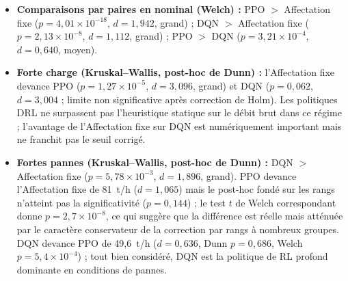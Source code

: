 \documentclass[11pt,a4paper]{article}
\begin{document}
\begin{itemize}
  \item \textbf{Comparaisons par paires en nominal (Welch) :} PPO $>$ Affectation fixe ($p=4{,}01\times10^{-18}$, $d=1{,}942$, grand) ; DQN $>$ Affectation fixe ($p=2{,}13\times10^{-8}$, $d=1{,}112$, grand) ; PPO $>$ DQN ($p=3{,}21\times10^{-4}$, $d=0{,}640$, moyen).
  \item \textbf{Forte charge (Kruskal--Wallis, post-hoc de Dunn) :} l'Affectation fixe devance PPO ($p=1{,}27\times10^{-5}$, $d=3{,}096$, grand) et DQN ($p=0{,}062$, $d=3{,}004$ ; limite non significative après correction de Holm). Les politiques DRL ne surpassent pas l'heuristique statique sur le débit brut dans ce régime ; l'avantage de l'Affectation fixe sur DQN est numériquement important mais ne franchit pas le seuil corrigé.
  \item \textbf{Fortes pannes (Kruskal--Wallis, post-hoc de Dunn) :} DQN $>$ Affectation fixe ($p=5{,}78\times10^{-3}$, $d=1{,}896$, grand). PPO devance l'Affectation fixe de 81~t/h ($d=1{,}065$) mais le post-hoc fondé sur les rangs n'atteint pas la significativité ($p=0{,}144$) ; le test $t$ de Welch correspondant donne $p=2{,}7\times10^{-8}$, ce qui suggère que la différence est réelle mais atténuée par le caractère conservateur de la correction par rangs à nombreux groupes. DQN devance PPO de 49,6~t/h ($d=0{,}636$, Dunn $p=0{,}686$, Welch $p=5{,}4\times10^{-4}$) ; tout bien considéré, DQN est la politique de RL profond dominante en conditions de pannes.
\end{itemize}
\end{document}
